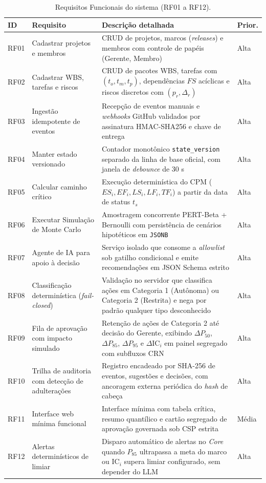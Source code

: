 \documentclass[12pt,openany,oneside,a4paper,english,brazilian,sumario=tradicional]{abntex2}
\newcommand{\fonteautores}{\par\vspace{1mm}{\small Fonte: Elaborado pelos autores (2026).}}
\newcommand{\IC}{\mathrm{IC}}
\begin{document}
\begin{table}[htbp]
\caption{Requisitos Funcionais do sistema (RF01 a RF12).}\label{tab:rf}
\footnotesize
\begin{tabularx}{\textwidth}{L{1cm} L{3.9cm} Y L{1.1cm}}
\toprule
\textbf{ID} & \textbf{Requisito} & \textbf{Descrição detalhada} & \textbf{Prior.}\\
\midrule
RF01 & Cadastrar projetos e membros & CRUD de projetos, marcos (\textit{releases}) e membros com controle de papéis (Gerente, Membro) & Alta\\
RF02 & Cadastrar WBS, tarefas e riscos & CRUD de pacotes WBS, tarefas com $(t_o,t_m,t_p)$, dependências $FS$ acíclicas e riscos discretos com $(p_r, \Delta_r)$ & Alta\\
RF03 & Ingestão idempotente de eventos & Recepção de eventos manuais e \textit{webhooks} GitHub validados por assinatura HMAC-SHA256 e chave de entrega & Alta\\
RF04 & Manter estado versionado & Contador monotônico \texttt{state\_\allowbreak version} separado da linha de base oficial, com janela de \textit{debounce} de 30 s & Alta\\
RF05 & Calcular caminho crítico & Execução determinística do CPM ($ES_i, EF_i, LS_i, LF_i, TF_i$) a partir da data de status $t_s$ & Alta\\
RF06 & Executar Simulação de Monte Carlo & Amostragem concorrente PERT-Beta + Bernoulli com persistência de cenários hipotéticos em \texttt{JSONB} & Alta\\
RF07 & Agente de IA para apoio à decisão & Serviço isolado que consome a \textit{allowlist} sob gatilho condicional e emite recomendações em JSON Schema estrito & Alta\\
RF08 & Classificação determinística (\textit{fail-closed}) & Validação no servidor que classifica ações em Categoria 1 (Autônoma) ou Categoria 2 (Restrita) e nega por padrão qualquer tipo desconhecido & Alta\\
RF09 & Fila de aprovação com impacto simulado & Retenção de ações de Categoria 2 até decisão do Gerente, exibindo $\Delta P_{50}$, $\Delta P_{85}$, $\Delta P_{95}$ e $\Delta\IC_i$ em painel segregado com subfluxos CRN & Alta\\
RF10 & Trilha de auditoria com detecção de adulterações & Registro encadeado por SHA-256 de eventos, sugestões e decisões, com ancoragem externa periódica do \textit{hash} de cabeça & Alta\\
RF11 & Interface web mínima funcional & Interface mínima com tabela crítica, resumo quantílico e cartão segregado de aprovação governada sob CSP estrita & Média\\
RF12 & Alertas determinísticos de limiar & Disparo automático de alertas no \textit{Core} quando $P_{85}$ ultrapassa a meta do marco ou $\IC_i$ supera limiar configurado, sem depender do LLM & Alta\\
\bottomrule
\end{tabularx}
\fonteautores
\end{table}
\end{document}
